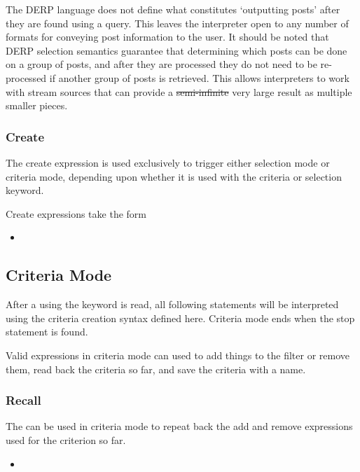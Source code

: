The DERP language does not define what constitutes ‘outputting posts’ after they are found using a query.
This leaves the interpreter open to any number of formats for conveying post information to the user.
It should be noted that DERP selection semantics guarantee that determining which posts can be done on a
group of posts, and after they are processed they do not need to be re-processed if another group of posts
is retrieved. This allows interpreters to work with stream sources that can provide a \st{semi-infinite} very
large result as multiple smaller pieces.

\subsubsection{Create}
The create expression is used exclusively to trigger either selection mode or criteria mode, depending upon
whether it is used with the criteria or selection keyword.

Create expressions take the form
\begin{itemize}[leftmargin=2in]
    \item[\nonterminal{create\_expression}] \bnf{:}    \bnf{(} \bnf{|} \bnf{)}
\end{itemize}

\subsection{Criteria Mode}\label{Criteria_Mode}
After a  using the keyword  is read, all following statements will be interpreted using
the criteria creation syntax defined here. Criteria mode ends when the stop statement is found.

Valid expressions in criteria mode can used to add things to the filter or remove them, read back the criteria so
far, and save the criteria with a name.

\subsubsection{Recall}
The  can be used in criteria mode to repeat back the add and remove expressions used for the
criterion so far.
\begin{itemize}[leftmargin=2in]
    \item[\nonterminal{recall\_expression}] \bnf{:} 
\end{itemize}

